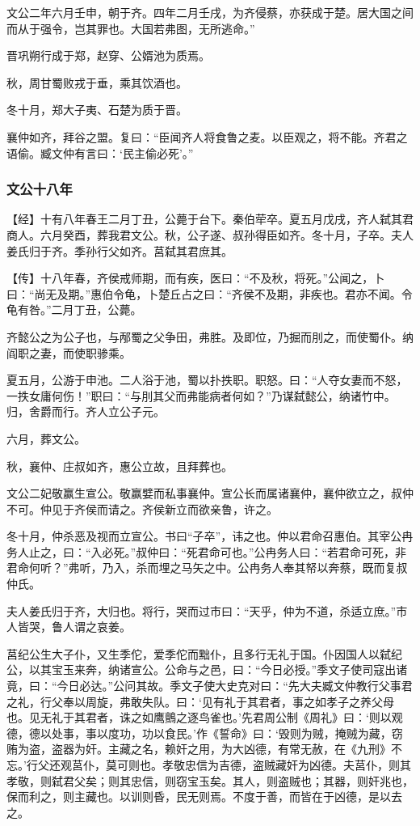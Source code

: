 \documentclass[]{article}
\begin{document}
文公二年六月壬申，朝于齐。四年二月壬戌，为齐侵蔡，亦获成于楚。居大国之间而从于强令，岂其罪也。大国若弗图，无所逃命。''

晋巩朔行成于郑，赵穿、公婿池为质焉。

秋，周甘蜀败戎于垂，乘其饮酒也。

冬十月，郑大子夷、石楚为质于晋。

襄仲如齐，拜谷之盟。复曰：``臣闻齐人将食鲁之麦。以臣观之，将不能。齐君之语偷。臧文仲有言曰：`民主偷必死'。''

\hypertarget{header-n1275}{%
\subsubsection{文公十八年}\label{header-n1275}}

【经】十有八年春王二月丁丑，公薨于台下。秦伯荦卒。夏五月戊戌，齐人弑其君商人。六月癸酉，葬我君文公。秋，公子遂、叔孙得臣如齐。冬十月，子卒。夫人姜氏归于齐。季孙行父如齐。莒弑其君庶其。

【传】十八年春，齐侯戒师期，而有疾，医曰：``不及秋，将死。''公闻之，卜曰：``尚无及期。''惠伯令龟，卜楚丘占之曰：``齐侯不及期，非疾也。君亦不闻。令龟有咎。''二月丁丑，公薨。

齐懿公之为公子也，与邴蜀之父争田，弗胜。及即位，乃掘而刖之，而使蜀仆。纳阎职之妻，而使职骖乘。

夏五月，公游于申池。二人浴于池，蜀以扑抶职。职怒。曰：``人夺女妻而不怒，一抶女庸何伤！''职曰：``与刖其父而弗能病者何如？''乃谋弑懿公，纳诸竹中。归，舍爵而行。齐人立公子元。

六月，葬文公。

秋，襄仲、庄叔如齐，惠公立故，且拜葬也。

文公二妃敬赢生宣公。敬赢嬖而私事襄仲。宣公长而属诸襄仲，襄仲欲立之，叔仲不可。仲见于齐侯而请之。齐侯新立而欲亲鲁，许之。

冬十月，仲杀恶及视而立宣公。书曰``子卒''，讳之也。仲以君命召惠伯。其宰公冉务人止之，曰：``入必死。''叔仲曰：``死君命可也。''公冉务人曰：``若君命可死，非君命何听？''弗听，乃入，杀而埋之马矢之中。公冉务人奉其帑以奔蔡，既而复叔仲氏。

夫人姜氏归于齐，大归也。将行，哭而过市曰：``天乎，仲为不道，杀适立庶。''市人皆哭，鲁人谓之哀姜。

莒纪公生大子仆，又生季佗，爱季佗而黜仆，且多行无礼于国。仆因国人以弑纪公，以其宝玉来奔，纳诸宣公。公命与之邑，曰：``今日必授。''季文子使司寇出诸竟，曰：``今日必达。''公问其故。季文子使大史克对曰：``先大夫臧文仲教行父事君之礼，行父奉以周旋，弗敢失队。曰：`见有礼于其君者，事之如孝子之养父母也。见无礼于其君者，诛之如鹰鸇之逐鸟雀也。'先君周公制《周礼》曰：`则以观德，德以处事，事以度功，功以食民。'作《誓命》曰：`毁则为贼，掩贼为藏，窃贿为盗，盗器为奸。主藏之名，赖奸之用，为大凶德，有常无赦，在《九刑》不忘。'行父还观莒仆，莫可则也。孝敬忠信为吉德，盗贼藏奸为凶德。夫莒仆，则其孝敬，则弑君父矣；则其忠信，则窃宝玉矣。其人，则盗贼也；其器，则奸兆也，保而利之，则主藏也。以训则昏，民无则焉。不度于善，而皆在于凶德，是以去之。
\end{document}
